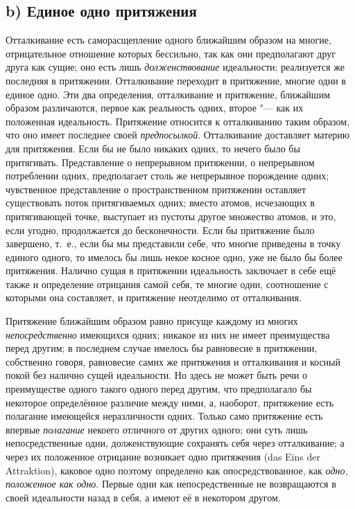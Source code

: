 \subsection[b) Единое одно притяжения]{b) Единое одно притяжения}

Отталкивание есть саморасщепление одного ближайшим образом на многие,
отрицательное отношение которых бессильно, так как они предполагают друг
друга как сущие; оно есть лишь {\em долженствование}
идеальности; реализуется же последняя в притяжении. Отталкивание переходит
в притяжение, многие одни в единое одно. Эти два определения, отталкивание
и притяжение, ближайшим образом различаются, первое как реальность одних,
второе "--- как их положенная идеальность. Притяжение относится к отталкиванию
таким образом, что оно имеет последнее своей
{\em предпосылкой}. Отталкивание доставляет материю для
притяжения. Если бы не было никаких одних, то нечего было бы притягивать.
Представление о непрерывном притяжении, о непрерывном потреблении одних,
предполагает столь же непрерывное порождение одних; чувственное
представление о пространственном притяжении оставляет существовать поток
притягиваемых одних; вместо атомов, исчезающих в притягивающей точке,
выступает из пустоты другое множество атомов, и это, если угодно,
продолжается до бесконечности. Если бы притяжение было завершено, т.~е.,
если бы мы представили себе, что многие приведены в точку единого одного,
то имелось бы лишь некое косное одно, уже не было бы более притяжения.
Налично сущая в притяжении идеальность заключает в себе ещё также и
определение отрицания самой себя, те многие одни, соотношение с которыми
она составляет, и притяжение неотделимо от отталкивания.

Притяжение ближайшим образом равно присуще каждому из многих
{\em непосредственно} имеющихся одних; никакое из них
не имеет преимущества перед другим; в последнем случае имелось бы
равновесие в притяжении, собственно говоря, равновесие самих же притяжения
и отталкивания и косный покой без налично сущей идеальности. Но здесь не
может быть речи о преимуществе одного такого одного перед другим, что
предполагало бы некоторое определённое различие между ними, а, наоборот,
притяжение есть полагание имеющейся неразличности одних. Только само
притяжение есть впервые {\em полагание} некоего
отличного от других одного; они суть лишь непосредственные одни,
долженствующие сохранять себя через отталкивание; а через их положенное
отрицание возникает одно притяжения (das Eins der Attraktion), каковое одно
поэтому определено как опосредствованное, как
{\em одно, положенное как одно}. Первые одни как
непосредственные не возвращаются в своей идеальности назад в себя, а имеют
её в некотором другом.

